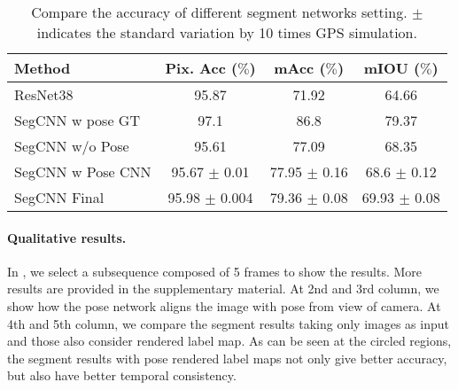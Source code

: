 \begin{table}
\center
\fontsize{8}{9}\selectfont
\begin{tabular}{lccc}
\toprule[0.1 em]
Method &Pix. Acc ($\%$) &  mAcc ($\%$) & mIOU ($\%$) \\
\hline
ResNet38~\cite{WuSH16e} & 95.87 & 71.92 & 64.66 \\
SegCNN w pose GT & 97.1 & 86.8 & 79.37 \\
SegCNN w/o Pose & 95.61 & 77.09 & 68.35 \\
SegCNN w Pose CNN & 95.67 $\pm$ 0.01 & 77.95 $\pm$ 0.16 & 68.6 $\pm$ 0.12\\
SegCNN Final & 95.98 $\pm$ 0.004 & 79.36 $\pm$ 0.08 & 69.93 $\pm$ 0.08 \\
\toprule[0.1 em]
\end{tabular}
\caption{Compare the accuracy of different segment networks setting. $\pm$ indicates the standard variation by 10 times GPS simulation.}
\label{tbl:segment}
\vspace{-0.3\baselineskip}
\end{table}

\paragraph{Qualitative results.} In , we select a subsequence composed of 5 frames to show the results. More results are provided in the supplementary material. At 2nd and 3rd column, we show how the pose network aligns the image with pose from view of camera. At 4th and 5th column, we compare the segment results taking only images as input and those also consider rendered label map. As can be seen at the circled regions, the segment results with pose rendered label maps not only give better accuracy, but also have better temporal consistency.
